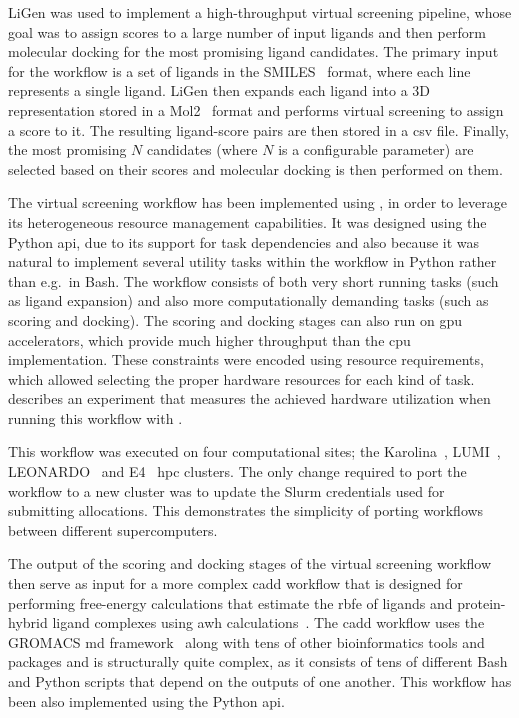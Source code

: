 LiGen was used to implement a high-throughput virtual screening pipeline, whose goal was to assign
scores to a large number of input ligands and then perform molecular docking for the most promising
ligand candidates. The primary input for the workflow is a set of ligands in the
SMILES~\cite{smiles} format, where each line represents a single ligand. LiGen then
expands each ligand into a 3D representation stored in a Mol2~\cite{mol2} format and
performs virtual screening to assign a score to it. The resulting ligand-score pairs are then
stored in a \gls{csv} file. Finally, the most promising $N$
candidates (where $N$ is a configurable parameter) are selected based on their
scores and molecular docking is then performed on them.

The virtual screening workflow has been implemented using \hyperqueue{}, in order to
leverage its heterogeneous resource management capabilities. It was designed using the Python
\gls{api}, due to its support for task dependencies and also because it was natural
to implement several utility tasks within the workflow in Python rather than e.g.\ in Bash. The
workflow consists of both very short running tasks (such as ligand expansion) and also more
computationally demanding tasks (such as scoring and docking). The scoring and docking stages can
also run on \gls{gpu} accelerators, which provide much higher throughput than the
\gls{cpu} implementation. These constraints were encoded using
\hq{} resource requirements, which allowed selecting the proper hardware
resources for each kind of task.  describes an experiment that measures the
achieved hardware utilization when running this workflow with \hyperqueue{}.

This workflow was executed on four computational sites; the Karolina~\cite{karolina},
LUMI~\cite{lumi}, LEONARDO~\cite{leonardo} and E4~\cite{e4}
\gls{hpc} clusters. The only change required to port the workflow to a new cluster
was to update the Slurm credentials used for submitting allocations. This demonstrates the
simplicity of porting \hyperqueue{} workflows between different supercomputers.

The output of the scoring and docking stages of the virtual screening workflow then serve as input
for a more complex \gls{cadd} workflow that is designed for performing free-energy
calculations that estimate the \gls{rbfe} of ligands and protein-hybrid ligand
complexes using \gls{awh} calculations~\cite{awh}. The
\gls{cadd} workflow uses the GROMACS \gls{md}
framework~\cite{gromacs} along with tens of other bioinformatics tools and packages and is
structurally quite complex, as it consists of tens of different Bash and Python scripts that depend
on the outputs of one another. This workflow has been also implemented using the
\hyperqueue{} Python \gls{api}.

